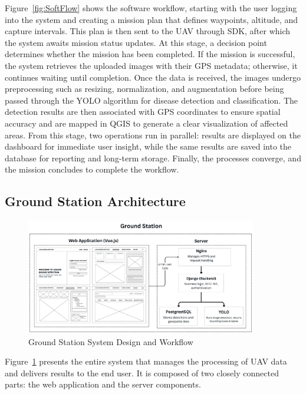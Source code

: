 Figure~\ref{fig:SoftFlow} shows the software workflow, starting with the user logging into the system and creating a mission plan that defines waypoints, altitude, and capture intervals. This plan is then sent to the UAV through SDK, after which the system awaits mission status updates. At this stage, a decision point determines whether the mission has been completed. If the mission is successful, the system retrieves the uploaded images with their GPS metadata; otherwise, it continues waiting until completion. Once the data is received, the images undergo preprocessing such as resizing, normalization, and augmentation before being passed through the YOLO algorithm for disease detection and classification. The detection results are then associated with GPS coordinates to ensure spatial accuracy and are mapped in QGIS to generate a clear visualization of affected areas. From this stage, two operations run in parallel: results are displayed on the dashboard for immediate user insight, while the same results are saved into the database for reporting and long-term storage. Finally, the processes converge, and the mission concludes to complete the workflow.

\subsection{Ground Station Architecture}

\begin{figure}[H]
	\centering
	\caption{Ground Station System Design and Workflow}
	\label{fig:GroundStation}
	\includegraphics[width=0.9\textwidth]{figures/Ground_Station.pdf}
\end{figure}

Figure~\ref{fig:GroundStation} presents the entire system that manages the processing of UAV data and delivers results to the end user. It is composed of two closely connected parts: the web application and the server components.

